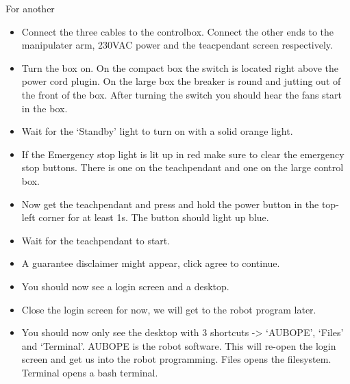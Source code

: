 \documentclass{article}
\begin{document}
For another 
\begin{itemize}
  \item Connect the three cables to the controlbox. Connect the other ends to the manipulater arm, 230VAC power and the teacpendant screen respectively.
  \item Turn the box on. On the compact box the switch is located right above the power cord plugin. On the large box the breaker is round and jutting out of the front of the box. After turning the switch you should hear the fans start in the box.
\begin{center}
\end{center}
\item Wait for the ‘Standby’ light to turn on with a solid orange light. 
\item If the Emergency stop light is lit up in red make sure to clear the emergency stop buttons. There is one on the teachpendant and one on the large control box. 
\item Now get the teachpendant and press and hold the power button in the top-left corner for at least 1s. The button should light up blue.
\item Wait for the teachpendant to start. 
\item A guarantee disclaimer might appear, click agree to continue. 
\item You should now see a login screen and a desktop. 
\item Close the login screen for now, we will get to the robot program later. 
\item You should now only see the desktop with 3 shortcuts -> ‘AUBOPE’, ‘Files’ and ‘Terminal’. AUBOPE is the robot software. This will re-open the login screen and get us into the robot programming. Files opens the filesystem. Terminal opens a bash terminal.
\end{itemize}
\end{document}
